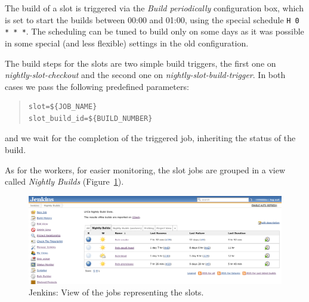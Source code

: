 \documentclass{lhcbnote}
\begin{document}
The build of a slot is triggered via the \emph{Build periodically} configuration
box, which is set to start the builds between 00:00 and 01:00, using the special
schedule \verb|H 0 * * *|.  The scheduling can be tuned to build only on some
days as it was possible in some special (and less flexible) settings in the old
configuration.

The build steps for the slots are two simple build triggers, the first one on
\emph{nightly-slot-checkout} and the second one on
\emph{nightly-slot-build-trigger}.  In both cases we pass the following
predefined parameters:
\begin{quote}
\begin{verbatim}
slot=${JOB_NAME}
slot_build_id=${BUILD_NUMBER}
\end{verbatim}
\end{quote}
and we wait for the completion of the triggered job, inheriting the status of
the build.

As for the workers, for easier monitoring, the slot jobs are grouped in a view
called \emph{Nightly Builds} (Figure~\ref{fig:jenkins-slots}).

\begin{figure}
  \begin{center}
    \includegraphics[width=15cm]{images/jenkins-1}
  \end{center}
  \caption{Jenkins: View of the jobs representing the slots.}
  \label{fig:jenkins-slots}
\end{figure}
\end{document}
